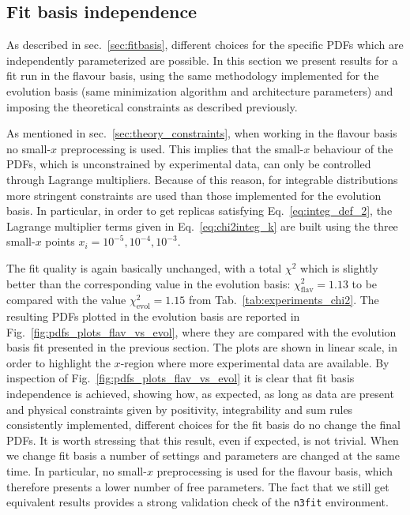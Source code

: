 \subsection{Fit basis independence}
As described in sec.~\ref{sec:fitbasis}, different choices for the specific PDFs which are independently
parameterized are possible.
In this section we present results for a fit run in the flavour basis, using the same methodology
implemented for the evolution basis (same minimization algorithm and architecture parameters) 
and imposing the theoretical constraints as described previously.

%
As mentioned in sec.~\ref{sec:theory_constraints}, when working in the flavour basis 
no small-$x$ preprocessing is used. This implies that the small-$x$ behaviour of the PDFs, which is unconstrained 
by experimental data, can only be controlled through Lagrange multipliers.
Because of this reason, for integrable distributions more stringent constraints are used than those implemented
for the evolution basis. In particular, in order to get replicas satisfying Eq.~\eqref{eq:integ_def_2},
the Lagrange multiplier terms given in Eq.~\eqref{eq:chi2integ_k} are built using the three small-$x$
points $x_i = 10^{-5}, 10^{-4}, 10^{-3}$. 

%
The fit quality is again basically unchanged, with a total $\chi^2$ which is slightly better than the corresponding 
value in the evolution basis: $\chi_{\text{flav}}^2=1.13$ to be compared with the value $\chi_{\text{evol}}^2=1.15$ 
from Tab.~\ref{tab:experiments_chi2}.
The resulting PDFs plotted in the evolution basis are reported in Fig.~\ref{fig:pdfs_plots_flav_vs_evol}, 
where they are compared with the evolution basis fit presented in the previous section.
The plots are shown in linear scale, in order to highlight the $x$-region where more experimental data are available.
By inspection of Fig.~\ref{fig:pdfs_plots_flav_vs_evol} it is clear that fit basis independence is achieved,
showing how, as expected, as long as data are present and physical constraints given by positivity, integrability and sum rules
consistently implemented, different choices for the fit basis do no change the final PDFs.
It is worth stressing that this result, even if expected, is not trivial. When we change fit basis a number
of settings and parameters are changed at the same time. In particular, no small-$x$ preprocessing
is used for the flavour basis, which therefore presents a lower number of free parameters.
The fact that we still get equivalent results provides a strong validation check of the {\tt n3fit} environment.

